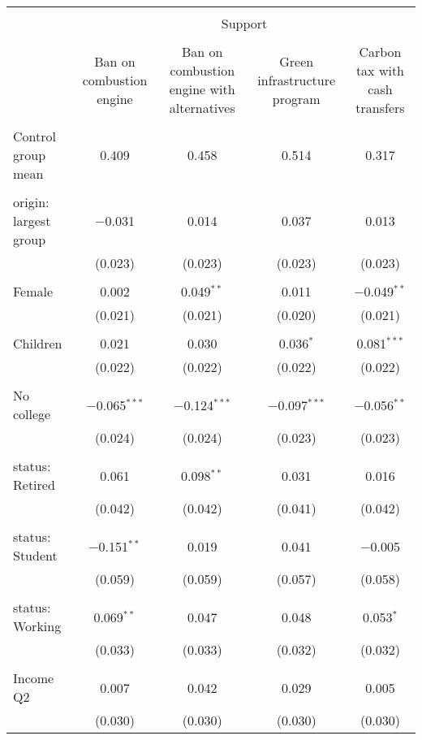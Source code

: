 
\begin{tabular}{@{\extracolsep{5pt}}lcccc} 
\\[-1.8ex]\hline 
\hline \\[-1.8ex] 
 & \multicolumn{4}{c}{Support} \\ 
\cline{2-5} 
\\[-1.8ex] & Ban on combustion engine & Ban on combustion engine with alternatives & Green infrastructure program & Carbon tax with cash transfers \\ 
\hline \\[-1.8ex] 
 Control group mean & 0.409 & 0.458 & 0.514 & 0.317  \\ \hline \\[-1.8ex] origin: largest group & $-$0.031 & 0.014 & 0.037 & 0.013 \\ 
  & (0.023) & (0.023) & (0.023) & (0.023) \\ 
  & & & & \\ 
 Female & 0.002 & 0.049$^{**}$ & 0.011 & $-$0.049$^{**}$ \\ 
  & (0.021) & (0.021) & (0.020) & (0.021) \\ 
  & & & & \\ 
 Children & 0.021 & 0.030 & 0.036$^{*}$ & 0.081$^{***}$ \\ 
  & (0.022) & (0.022) & (0.022) & (0.022) \\ 
  & & & & \\ 
 No college & $-$0.065$^{***}$ & $-$0.124$^{***}$ & $-$0.097$^{***}$ & $-$0.056$^{**}$ \\ 
  & (0.024) & (0.024) & (0.023) & (0.023) \\ 
  & & & & \\ 
 status: Retired & 0.061 & 0.098$^{**}$ & 0.031 & 0.016 \\ 
  & (0.042) & (0.042) & (0.041) & (0.042) \\ 
  & & & & \\ 
 status: Student & $-$0.151$^{**}$ & 0.019 & 0.041 & $-$0.005 \\ 
  & (0.059) & (0.059) & (0.057) & (0.058) \\ 
  & & & & \\ 
 status: Working & 0.069$^{**}$ & 0.047 & 0.048 & 0.053$^{*}$ \\ 
  & (0.033) & (0.033) & (0.032) & (0.032) \\ 
  & & & & \\ 
 Income Q2 & 0.007 & 0.042 & 0.029 & 0.005 \\ 
  & (0.030) & (0.030) & (0.030) & (0.030) \\ 

\end{tabular}
